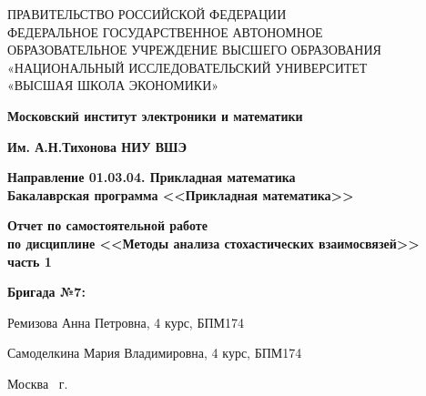 \begin{titlepage}
	\begin{center}
		ПРАВИТЕЛЬСТВО РОССИЙСКОЙ ФЕДЕРАЦИИ \\
 		ФЕДЕРАЛЬНОЕ  ГОСУДАРСТВЕННОЕ АВТОНОМНОЕ \\
		ОБРАЗОВАТЕЛЬНОЕ УЧРЕЖДЕНИЕ ВЫСШЕГО ОБРАЗОВАНИЯ\\
		«НАЦИОНАЛЬНЫЙ ИССЛЕДОВАТЕЛЬСКИЙ УНИВЕРСИТЕТ\\
		«ВЫСШАЯ ШКОЛА ЭКОНОМИКИ»
	\end{center}
	
	\begin{center}
		\textbf{Московский институт электроники и математики}
		
		\textbf{Им. А.Н.Тихонова НИУ ВШЭ}
		
		\vspace{2ex}
		
		\textbf{Направление 01.03.04. Прикладная математика \\
			Бакалаврская программа <<Прикладная математика>>}
	\end{center}
	\vspace{1ex}	
	
	\vspace{1ex}
	\begin{center}
		\textbf{Отчет по самостоятельной работе \\
			по дисциплине <<Методы анализа стохастических взаимосвязей>>\\
			часть 1
	}
	\end{center}	

	\vspace{2ex}
	\vfill
	
	\vspace{2ex}
	
	\begin{flushright}
		\textbf{Бригада №7:}
		
		\vspace{2ex}
		
		Ремизова Анна Петровна, 4 курс, БПМ174
		
		Самоделкина Мария Владимировна, 4 курс, БПМ174

	\end{flushright}

	\vspace{5ex}
	\begin{center}
		Москва \the\year \, г.
	\end{center}
	
\end{titlepage}
\addtocounter{page}{1}